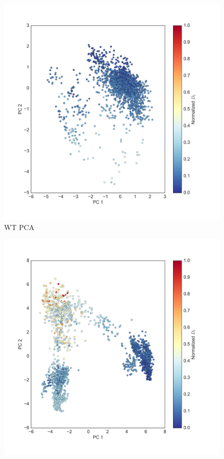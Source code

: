 \begin{figure}
\centering
\includegraphics[height=0.5\textheight]{figures/2d_scatter_wt.png}
\caption{WT PCA}
\end{figure}

\begin{figure}
\centering
\includegraphics[height=0.5\textheight]{figures/2d_scatter_yd.png}
\end{figure}


